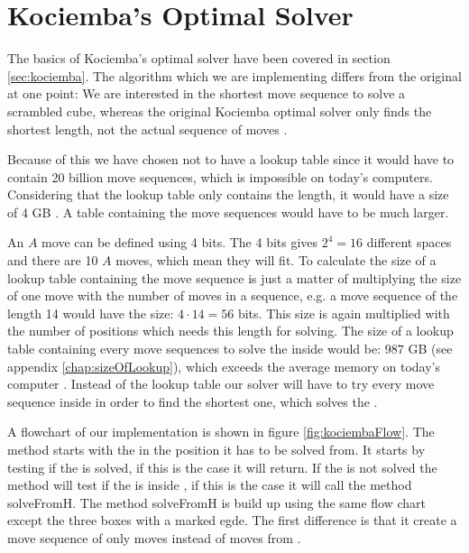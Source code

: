 \chapter{Kociemba's Optimal Solver}
\label{chap:kociembaImplement}
The basics of Kociemba's optimal solver have been covered in section \ref{sec:kociemba}. The algorithm which we are implementing differs from the original at one point:
We are interested in the shortest move sequence to solve a scrambled cube, whereas the original Kociemba optimal solver only finds the shortest length, not the actual sequence of moves \cite{rokicki09}.

Because of this we have chosen not to have a lookup table since it would have to contain 20 billion move sequences, which is impossible on today's computers. Considering that the lookup table only contains the length, it would have a size of 4 GB \cite{cubeExplorer}. A table containing the move sequences would have to be much larger.

An $A$ move can be defined using 4 bits.
The 4 bits gives $2^4=16$ different spaces and there are 10 $A$ moves, which mean they will fit.
To calculate the size of a lookup table containing the move sequence is just a matter of multiplying the size of one move with the number of moves in a sequence, e.g. a move sequence of the length 14 would have the size: $4 \cdot 14 = 56$ bits.
This size is again multiplied with the number of positions which needs this length for solving.
The size of a lookup table containing every move sequences to solve the \rubik{} inside  would be: $987$ GB (see appendix \ref{chap:sizeOfLookup}), which exceeds the average memory on today's computer \cite{averageRAM} \cite{maxRAM2}.
Instead of the lookup table our solver will have to try every move sequence inside  in order to find the shortest one, which solves the \rubik{}.

A flowchart of our implementation is shown in figure \ref{fig:kociembaFlow}.
The method starts with the \rubik{} in the position it has to be solved from.
It starts by testing if the \rubik{} is solved, if this is the case it will return.
If the \rubik{} is not solved the method will test if the \rubik{} is inside , if this is the case it will call the method solveFromH.
The method solveFromH is build up using the same flow chart except the three boxes with a marked egde.
The first difference is that it create a move sequence of only  moves instead of moves from .


